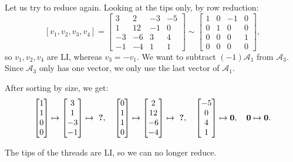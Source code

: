 \documentclass[12pt]{article}
\newcommand{\1}{\mathbf{1}}
\newcommand{\0}{\mathbf{0}}
\newcommand{\A}{\mathcal{A}}
\theoremstyle{definition}
\begin{document}
Let us try to reduce again.
Looking at the tips only, by row reduction:
\[
[v_1, v_2, v_3, v_4] =
\left[\begin{matrix}3 & 2 & -3 & -5\\1 & 12 & -1 & 0\\-3 & -6 & 3 & 4\\-1 & -4 & 1 & 1\end{matrix}\right]
\sim
\left[\begin{matrix}1 & 0 & -1 & 0\\0 & 1 & 0 & 0\\0 & 0 & 0 & 1\\0 & 0 & 0 & 0\end{matrix}\right]
,
\]
so $v_1,v_2,v_4$ are LI, whereas $v_3 = -v_1$.
We want to subtract $(-1)\A_1$ from $\A_3$.
Since $\A_3$ only has one vector, we only use the last vector of $\A_1$.

After sorting by size, we get:
\[
\left[\begin{matrix}1 \\ 1 \\ 0 \\ 0\end{matrix}\right]
\mapsto
\left[\begin{matrix}3 \\ 1 \\ -3 \\ -1\end{matrix}\right]
\mapsto
\text{ \bf ?}
,\ \ \
\left[\begin{matrix}0 \\ 1 \\ 1 \\ 0\end{matrix}\right]
\mapsto
\left[\begin{matrix}2 \\ 12 \\ -6 \\ -4\end{matrix}\right]
\mapsto
\text{ \bf ?}
,\ \ \
\left[\begin{matrix}-5\\0\\4\\1\end{matrix}\right]
\mapsto
\0
,\ \ \
\0
\mapsto
\0
.
\]

The tips of the threads are LI, so we can no longer reduce.
\end{document}
